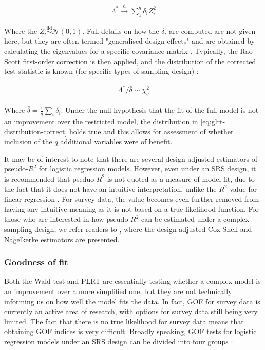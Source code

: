 \begin{align}
\label{eq:plrt-distribution}
\Lambda^{*} \xrightarrow{\text{d}} \sum_{1}^{q} \delta_{i} Z_{i}^{2}
\end{align}

Where the $Z_{i} \overset{\mathrm{iid}}{\sim} \mathcal{N}(0, 1)$. Full details on how the $\delta_{i}$ are computed are not given here, but they are often termed "generalised design effects" and are obtained by calculating the eigenvalues for a specific covariance matrix \citep{rao1981, rao1984}. Typically, the Rao-Scott first-order correction is then applied, and the distribution of the corrected test statistic is known (for specific types of sampling design) \citep{rao1981, lumley2014}:

\begin{align}
\label{eq:glrt-distribution-correct}
\Lambda^{*} / \bar{\delta} \sim \chi^{2}_{q}
\end{align}

Where $\bar{\delta} = \frac{1}{q} \sum_{i} \delta_{i}$. Under the null hypothesis that the fit of the full model is not an improvement over the restricted model, the distribution in \autoref{eq:glrt-distribution-correct} holds true and this allows for assessment of whether inclusion of the $q$ additional variables were of benefit.

It may be of interest to note that there are several design-adjusted estimators of pseudo-$R^{2}$ for logistic regression models. However, even under an SRS design, it is recommended that pseduo-$R^{2}$ is not quoted as a measure of model fit, due to the fact that it does not have an intuitive interpretation, unlike the $R^{2}$ value for linear regression \citep{hosmer2000, heeringa2017}. For survey data, the value becomes even further removed from having any intuitive meaning as it is not based on a true likelihood function. For those who are interested in how pseudo-$R^{2}$ can be estimated under a complex sampling design, we refer readers to \citet{lumley2017}, where the design-adjusted Cox-Snell and Nagelkerke estimators are presented.

\subsubsection{Goodness of fit}

Both the Wald test and PLRT are essentially testing whether a complex model is an improvement over a more simplified one, but they are not technically informing us on how well the model fits the data. In fact, GOF for survey data is currently an active area of research, with options for survey data still being very limited. The fact that there is no true likelihood for survey data means that obtaining GOF indices is very difficult. Broadly speaking, GOF tests for logistic regression models under an SRS design can be divided into four groups \citep{liu2007}:

